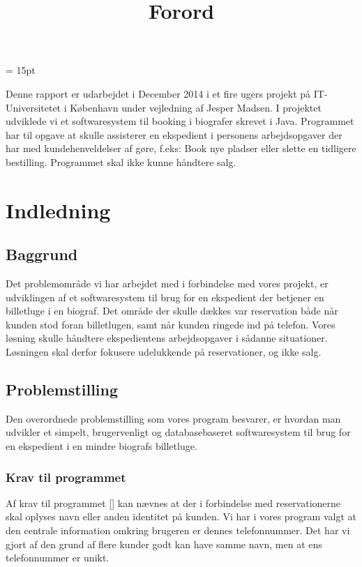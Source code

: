 \documentclass[final]{report}
\begin{document}
\begin{titlepage}

\end{titlepage}






 
\baselineskip= 15pt

\title{Forord}
Denne rapport er udarbejdet i December 2014 i et fire ugers projekt på IT-Universitetet i København under vejledning af Jesper Madsen.
I projektet udviklede vi et softwaresystem til booking i biografer skrevet i Java. Programmet har til opgave at skulle assisterer en ekspedient i personens arbejdsopgaver der har med kundehenveldelser af gøre, f.eks: Book nye pladser eller slette en tidligere bestilling. Programmet skal ikke kunne håndtere salg.

\tableofcontents

\chapter{Indledning}
\section{Baggrund}
Det problemområde vi har arbejdet med i forbindelse med vores projekt, er udviklingen af et softwaresystem til brug for en ekspedient der betjener en billetluge i en biograf. Det område der skulle dækkes var reservation både når kunden stod foran billetlugen, samt når kunden ringede ind på telefon. Vores løsning skulle håndtere   ekspedientens arbejdsopgaver i sådanne situationer. Løsningen skal derfor fokusere udelukkende på reservationer, og ikke salg. 

\section{Problemstilling}
Den overordnede problemstilling som vores program besvarer, er hvordan man udvikler et simpelt, brugervenligt og databasebaseret softwaresystem til brug for en ekspedient i en mindre biografs billetluge. 

\subsection{Krav til programmet}
Af krav til programmet [\cite{opg}] kan nævnes at der i forbindelse med reservationerne skal oplyses navn eller anden identitet på kunden. Vi har i vores program valgt at den centrale information omkring brugeren er dennes telefonnummer. Det har vi gjort af den grund af flere kunder godt kan have samme navn, men at ens telefonnummer er unikt.  
\end{document}
